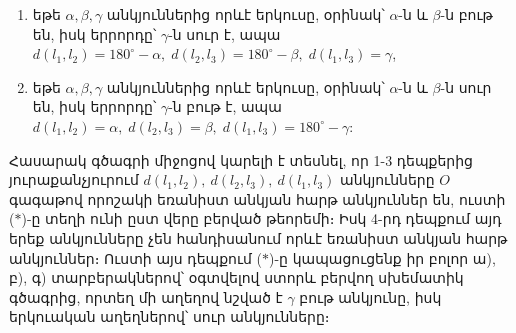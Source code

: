 \documentclass[./main.tex]{subfiles}
\begin{document}
\begin{example}
\begin{enumerate}
\item եթե $\alpha,\beta,\gamma$ անկյուններից որևէ երկուսը, օրինակ՝ $\alpha$-ն և $\beta$-ն բութ են, իսկ երրորդը՝ $\gamma$-ն սուր է, ապա $d(l_1,l_2)=180^{\circ}-\alpha,\;d(l_2,l_3)=180^{\circ}-\beta,\;d(l_1,l_3)=\gamma$,

\item եթե $\alpha,\beta,\gamma$ անկյուններից որևէ երկուսը, օրինակ՝ $\alpha$-ն և $\beta$-ն սուր են, իսկ երրորդը՝ $\gamma$-ն բութ է, ապա $d(l_1,l_2)=\alpha,\;d(l_2,l_3)=\beta,\;d(l_1,l_3)=180^{\circ}-\gamma$:
\end{enumerate}

\par Հասարակ գծագրի միջոցով կարելի է տեսնել, որ 1-3 դեպքերից յուրաքանչյու\-րում $d(l_1,l_2),\ d(l_2,l_3),\ d(l_1,l_3)$ անկյունները $O$ գագաթով որոշակի եռանիստ անկյան հարթ անկյուններ են, ուստի ($\ast$)-ը տեղի ունի ըստ վերը բերված թեորեմի։ Իսկ 4-րդ դեպքում այդ երեք անկյունները չեն հանդիսանում որևէ եռանիստ անկյան հարթ անկյուններ։ Ուստի այս դեպքում ($\ast$)-ը կապացուցենք իր բոլոր ա), բ), գ) տար\-բե\-րակ\-նե\-րով՝ օգտվելով ստորև բերվող սխեմատիկ գծագրից, որտեղ մի աղեղով նշված է $\gamma$ բութ անկյունը, իսկ երկուական աղեղներով՝ սուր անկյունները։

\begin{center}
\end{center}
\end{example}
\end{document}
